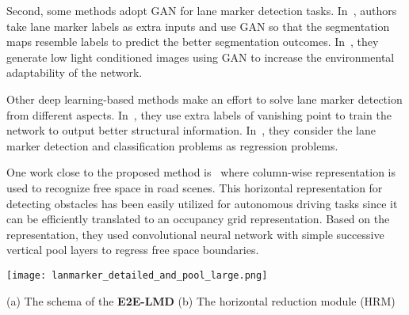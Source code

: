\documentclass[10pt,twocolumn,letterpaper]{article}
\begin{document}
Second, some methods adopt GAN for lane marker detection tasks. In~\cite{ElGAN}, authors take lane marker labels as extra inputs and use GAN so that the segmentation maps resemble labels to predict the better segmentation outcomes. In~\cite{LaneGan}, they generate low light conditioned images using GAN to increase the environmental adaptability of the network. 

Other deep learning-based methods make an effort to solve lane marker detection from different aspects.  
In~\cite{VPG}, they use extra labels of vanishing point to train the network to output better structural information. In~\cite{MultiRegress}, they consider the lane marker detection and classification problems as regression problems.


One work close to the proposed method is~\cite{Drivable, StixelNet} where column-wise representation is used to recognize free space in road scenes. This horizontal representation for detecting obstacles has been easily utilized for autonomous driving tasks since it can be efficiently translated to an occupancy grid representation. Based on the representation, they used convolutional neural network with simple successive vertical pool layers to regress free space boundaries.  

\def\algorithmname{E2E-LMD}
\def\reductionname{HRM}
\def\reductionnames{HRMs}

\begin{figure*}[t]
	\begin{center}
		\texttt{[image: lanmarker\_detailed\_and\_pool\_large.png]}
	\end{center}
	\vspace{-10.pt}
	
	\footnotesize
	\makebox[0.3\textwidth][l]{} (a) The schema of the \textbf{\algorithmname}  \makebox[0.18\textwidth][l]{} (b) The horizontal reduction module (\reductionname)
	
	\vspace{5.pt}
	\caption{The \textbf{\algorithmname} architecture for lane marker detection. We extend general encoder-decoder architectures by adding successive horizontal reduction modules for end-to-end lane marker detection. Numbers under each block denote spatial resolution and channels. \textbf{(a)} Arrows with \reductionname\ denote a horizontal reduction module of (b). Arrows with \textit{Conv} are output convolution with . Dashed arrows denote the global average pooling with a fully connected layer. \textbf{(b)} \reductionname\ is utilized to compress the horizontal representation.  denotes the pooling ratio for width part. Conv kernel size  is set as 3 except the last \reductionname\ layer which set as 1.}
	\vspace{-3.pt}
	\label{fig:arch_deteails}
\end{figure*}
\end{document}
